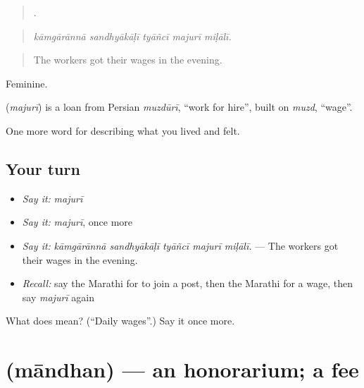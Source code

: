 \begin{quote}
    .
\end{quote}

\begin{quote}
\emph{kāmgārānnā sandhyākāḷī tyāñcī majurī miḷālī.}
\end{quote}

\begin{quote}
The workers got their wages in the evening.
\end{quote}

Feminine.

\begin{cousinweb}
\textbf{} (\emph{majurī}) is a loan from Persian \emph{muzdūrī}, \textquotedblleft{}work for hire\textquotedblright{}, built on \emph{muzd}, \textquotedblleft{}wage\textquotedblright{}.
\end{cousinweb}

\begin{grammarlens}[title={What you've built}]
One more word for describing what you lived and felt.
\end{grammarlens}

\subsection*{Your turn}
\begin{itemize}
\raggedright
  \item \emph{Say it:} \emph{majurī}
  \item \emph{Say it:} \emph{majurī}, once more
  \item \emph{Say it:} \emph{kāmgārānnā sandhyākāḷī tyāñcī majurī miḷālī.} — The workers got their wages in the evening.
  \item \emph{Recall:} say the Marathi for to join a post, then the Marathi for a wage, then say \emph{majurī} again
\end{itemize}

\begin{tcolorbox}[breakable,colback=teal!4,colframe=teal!35!black,title={Before you move on}]
What does  mean? (\textquotedblleft{}Daily wages\textquotedblright{}.) Say it once more.
\end{tcolorbox}
\section[\texorpdfstring{\mr{मानधन} (māndhan)}{मानधन (māndhan)}]{ (māndhan) — an honorarium; a fee}

